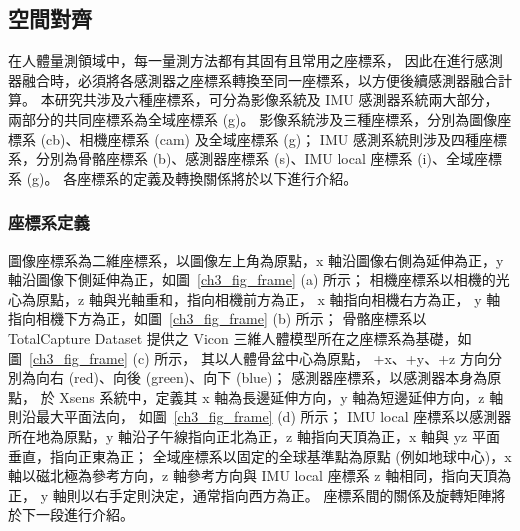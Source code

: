 \subsection{空間對齊}
在人體量測領域中，每一量測方法都有其固有且常用之座標系，
因此在進行感測器融合時，必須將各感測器之座標系轉換至同一座標系，以方便後續感測器融合計算。
本研究共涉及六種座標系，可分為影像系統及 IMU 感測器系統兩大部分，兩部分的共同座標系為全域座標系 (g)。
影像系統涉及三種座標系，分別為圖像座標系 (cb)、相機座標系 (cam) 及全域座標系 (g)；
IMU 感測系統則涉及四種座標系，分別為骨骼座標系 (b)、感測器座標系 (s)、IMU local 座標系 (i)、全域座標系 (g)。
各座標系的定義及轉換關係將於以下進行介紹。

\subsubsection{座標系定義}
圖像座標系為二維座標系，以圖像左上角為原點，x 軸沿圖像右側為延伸為正，y 軸沿圖像下側延伸為正，如圖~\ref{ch3_fig_frame} (a) 所示；
相機座標系以相機的光心為原點，z 軸與光軸重和，指向相機前方為正， x 軸指向相機右方為正， y 軸指向相機下方為正，如圖~\ref{ch3_fig_frame} (b) 所示；
骨骼座標系以 TotalCapture Dataset 提供之 Vicon 三維人體模型所在之座標系為基礎，如圖~\ref{ch3_fig_frame} (c) 所示，
其以人體骨盆中心為原點， +x、+y、+z 方向分別為向右 (red)、向後 (green)、向下 (blue)；
感測器座標系，以感測器本身為原點，
於 Xsens 系統中，定義其 x 軸為長邊延伸方向，y 軸為短邊延伸方向，z 軸則沿最大平面法向，
如圖~\ref{ch3_fig_frame} (d) 所示；
IMU local 座標系以感測器所在地為原點，y 軸沿子午線指向正北為正，z 軸指向天頂為正，x 軸與 yz 平面垂直，指向正東為正；
全域座標系以固定的全球基準點為原點 (例如地球中心)，x 軸以磁北極為參考方向，z 軸參考方向與 IMU local 座標系 z 軸相同，指向天頂為正，
y 軸則以右手定則決定，通常指向西方為正。
座標系間的關係及旋轉矩陣將於下一段進行介紹。

